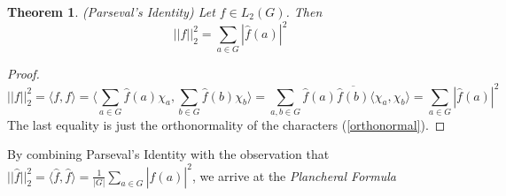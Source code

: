 \documentclass{amsart}
\newtheorem{theorem}{Theorem}[section]
\theoremstyle{definition}
\theoremstyle{remark}
\numberwithin{equation}{section}
\theoremstyle{remark}
\begin{document}
\begin{theorem}{(Parseval's Identity)}
  Let $f \in L_2(G)$. Then
  $$ ||f||_2^2 = \sum_{a \in G} |\hat{f}(a)|^2$$
\end{theorem}
%
\begin{proof}
  $$ ||f||^2_2 = \langle f, f \rangle = \langle \sum_{a \in G} \hat{f}(a) \chi_a,  \sum_{b \in G} \hat{f}(b) \chi_b \rangle = \sum_{a,b \in G} \hat{f}(a)\overline{\hat{f}(b)}\langle \chi_a, \chi_b \rangle = \sum_{a \in G} |\hat{f}(a)|^2 $$
  The last equality is just the orthonormality of the characters (\ref{orthonormal}).
\end{proof}
%
By combining Parseval's Identity with the observation that $||\hat{f}||_2^2 = \langle \hat{f}, \hat{f} \rangle = \frac{1}{|G|}\sum_{a \in G} |\hat{f}(a)|^2$, we arrive at the \emph{Plancheral Formula}
\end{document}
